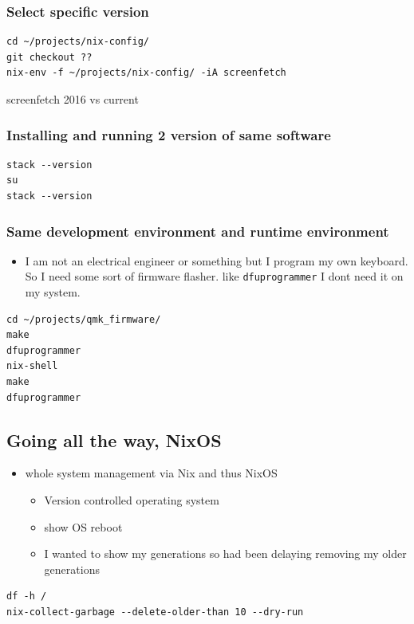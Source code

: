 \documentclass[11pt]{article}
\begin{document}
\subsubsection{Select specific version}
\label{sec:orgff973a3}
\begin{verbatim}
cd ~/projects/nix-config/
git checkout ??
nix-env -f ~/projects/nix-config/ -iA screenfetch
\end{verbatim}
screenfetch 2016 vs current
\subsubsection{Installing and running 2 version of same software}
\label{sec:org75b7672}
\begin{verbatim}
stack --version
su
stack --version
\end{verbatim}
\subsubsection{Same development environment and runtime environment}
\label{sec:orgbcda1af}
\begin{itemize}
\item I am not an electrical engineer or something but I program my
own keyboard. So I need some sort of firmware flasher. like
\texttt{dfuprogrammer} I dont need it on my system.
\end{itemize}
\begin{verbatim}
cd ~/projects/qmk_firmware/
make
dfuprogrammer
nix-shell
make
dfuprogrammer
\end{verbatim}
\subsection{Going all the way, NixOS}
\label{sec:org8030be9}
\begin{itemize}
\item whole system management via Nix and thus NixOS
\begin{itemize}
\item Version controlled operating system
\item show OS reboot
\item I wanted to show my generations so had been delaying removing
my older generations
\end{itemize}
\end{itemize}
\begin{verbatim}
df -h /
nix-collect-garbage --delete-older-than 10 --dry-run
\end{verbatim}
\end{document}
